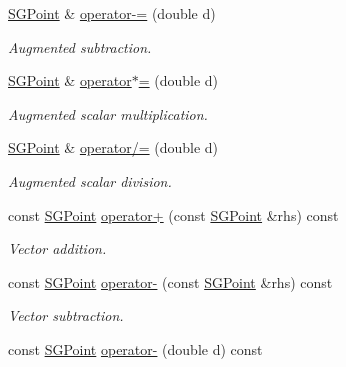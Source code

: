 \begin{DoxyCompactItemize}
\hyperlink{classSGPoint}{S\+G\+Point} \& \hyperlink{classSGPoint_a782b0dfeaa473a82e5285d93084380e8}{operator-\/=} (double d)
\begin{DoxyCompactList}\small\item\em Augmented subtraction. \end{DoxyCompactList}\item 
\mbox{\label{classSGPoint_a2d16a99bae47723ddb8eb0257254bf9e}} 
\hyperlink{classSGPoint}{S\+G\+Point} \& \hyperlink{classSGPoint_a2d16a99bae47723ddb8eb0257254bf9e}{operator$\ast$=} (double d)
\begin{DoxyCompactList}\small\item\em Augmented scalar multiplication. \end{DoxyCompactList}\item 
\mbox{\label{classSGPoint_acd23eead6f4b4240d532beaf1dfff30d}} 
\hyperlink{classSGPoint}{S\+G\+Point} \& \hyperlink{classSGPoint_acd23eead6f4b4240d532beaf1dfff30d}{operator/=} (double d)
\begin{DoxyCompactList}\small\item\em Augmented scalar division. \end{DoxyCompactList}\item 
\mbox{\label{classSGPoint_ab5c13ab94b4deea4ec7bfcaeb762fcf9}} 
const \hyperlink{classSGPoint}{S\+G\+Point} \hyperlink{classSGPoint_ab5c13ab94b4deea4ec7bfcaeb762fcf9}{operator+} (const \hyperlink{classSGPoint}{S\+G\+Point} \&rhs) const
\begin{DoxyCompactList}\small\item\em Vector addition. \end{DoxyCompactList}\item 
\mbox{\label{classSGPoint_a9469212b8d7e1baba557e980beb0bd5b}} 
const \hyperlink{classSGPoint}{S\+G\+Point} \hyperlink{classSGPoint_a9469212b8d7e1baba557e980beb0bd5b}{operator-\/} (const \hyperlink{classSGPoint}{S\+G\+Point} \&rhs) const
\begin{DoxyCompactList}\small\item\em Vector subtraction. \end{DoxyCompactList}\item 
\mbox{\label{classSGPoint_a32817266aa71ac4720c3e1916ae76028}} 
const \hyperlink{classSGPoint}{S\+G\+Point} \hyperlink{classSGPoint_a32817266aa71ac4720c3e1916ae76028}{operator-\/} (double d) const

\end{DoxyCompactItemize}
